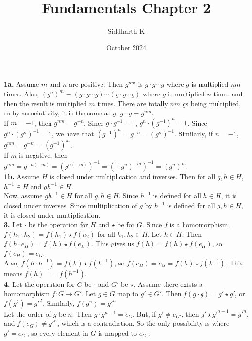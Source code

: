 \documentclass{article}
\title{Fundamentals Chapter 2}
\author{Siddharth K}
\date{October 2024}
\begin{document}
\maketitle

\textbf{1a.} Assume $m$ and $n$ are positive. Then $g^{nm}$ is $g\cdot g \cdots g$ where $g$ is multiplied $nm$ times. Also, $(g^n)^m = (g\cdot g\cdots g)\cdots (g\cdot g\cdots g)$ where $g$ is multiplied $n$ times and then the result is multiplied $m$ times. There are totally $nm$ $g$s being multiplied, so by associativity, it is the same as $g\cdot g\cdots g = g^{nm}$. \\

If $m = -1$, then $g^{nm} = g^{-n}$. Since $g\cdot g^{-1} = 1$, $g^n\cdot (g^{-1})^n = 1$. Since $g^n\cdot (g^n)^{-1} = 1$, we have that $(g^{-1})^n = g^{-n} = (g^{n})^{-1}$. Similarly, if $n = -1$, $g^{nm} = g^{-m} = (g^{-1})^m$. \\

If $m$ is negative, then $g^{nm} = g^{-n(-m)} = (g^{n(-m)})^{-1} = ((g^n)^{-m})^{-1} = (g^n)^m$. \\

\textbf{1b.} Assume $H$ is closed under multiplication and inverses. Then for all $g, h \in H$, $h^{-1} \in H$ and $gh^{-1} \in H$. \\

Now, assume $gh^{-1} \in H$ for all $g, h \in H$. Since $h^{-1}$ is defined for all $h \in H$, it is closed under inverses. Since multiplication of $g$ by $h^{-1}$ is defined for all $g, h \in H$, it is closed under multiplication. \\

\textbf{3.} Let $\cdot$ be the operation for $H$ and $\star$ be for $G$. Since $f$ is a homomorphism, $f(h_1\cdot h_2) = f(h_1)\star f(h_2)$ for all $h_1, h_2 \in H$. Let $h \in H$. Then $f(h\cdot e_H) = f(h)\star f(e_H)$. This gives us $f(h) = f(h)\star f(e_H)$, so $f(e_H) = e_G$. \\

Also, $f(h\cdot h^{-1}) = f(h)\star f(h^{-1})$, so $f(e_H) = e_G = f(h)\star f(h^{-1})$. This means $f(h)^{-1} = f(h^{-1})$. \\

\textbf{4.} Let the operation for $G$ be $\cdot$ and $G'$ be $\star$. Assume there exists a homomorphism $f: G \to G'$. Let $g \in G$ map to $g' \in G'$. Then $f(g\cdot g) = g'\star g'$, or $f(g^2) = g'^2$. Similarly, $f(g^n) = g'^n$ \\

Let the order of $g$ be $n$. Then $g\cdot g^{n - 1} = e_G$. But, if $g' \neq e_{G'}$, then $g' \star g'^{n - 1} = g'^n$, and $f(e_G) \neq g'^n$, which is a contradiction. So the only possibility is where $g' = e_{G'}$, so every element in $G$ is mapped to $e_{G'}$. \\
\end{document}
